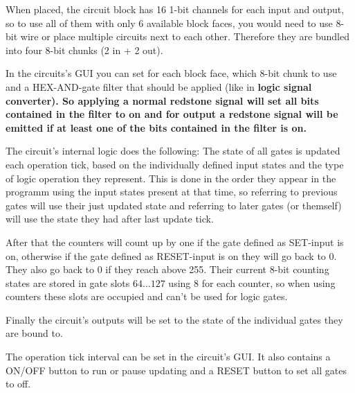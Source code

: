 \documentclass[11pt]{article} %
\begin{document}
When placed, the circuit block has 16 1-bit channels for each input and output, so to use all of them with only 6 available block faces, you would need to use 8-bit wire or place multiple circuits next to each other. Therefore they are bundled into four 8-bit chunks (2 in + 2 out).

In the circuits's GUI you can set for each block face, which 8-bit chunk to use and a HEX-AND-gate filter that should be applied (like in \bf logic signal converter\rm ). So applying a normal redstone signal will set all bits contained in the filter to on and for output a redstone signal will be emitted if at least one of the bits contained in the filter is on.

The circuit's internal logic does the following:
The state of all gates is updated each operation tick, based on the individually defined input states and the type of logic operation they represent. This is done in the order they appear in the programm using the input states present at that time, so referring to previous gates will use their just updated state and referring to later gates (or themself) will use the state they had after last update tick.

After that the counters will count up by one if the gate defined as SET-input is on, otherwise if the gate defined as RESET-input is on they will go back to 0. They also go back to 0 if they reach above 255. Their current 8-bit counting states are stored in gate slots $64\dots127$ using 8 for each counter, so when using counters these slots are occupied and can't be used for logic gates.

Finally the circuit's outputs will be set to the state of the individual gates they are bound to.

The operation tick interval can be set in the circuit's GUI. It also contains a ON/OFF button to run or pause updating and a RESET button to set all gates to off.
\end{document}

